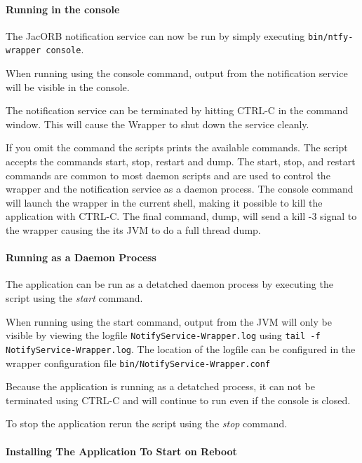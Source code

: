 \paragraph{Running in the console}
\label{sec:running-console}

 The JacORB notification service  can now be run by simply executing
 \texttt{bin/ntfy-wrapper console}.

 When running using the console command, output from the notification
 service will be visible in the console. 

 The notification service can be terminated by hitting CTRL-C in the command
 window. This will cause the Wrapper to shut down the service cleanly.  

 If you omit the command the scripts prints the available commands.
 The script accepts the commands start, stop, restart and dump. The
 start, stop, and restart commands are common to most daemon scripts
 and are used to control the wrapper and the notification service  as
 a daemon process. The console 
 command will launch the wrapper in the current shell, making it
 possible to kill the application with CTRL-C. The final command,
 dump, will send a kill -3 signal to the wrapper causing the its JVM
 to do a full thread dump.  
 
 \paragraph{Running as a Daemon Process}
 \label{sec:running-as-daemon}
 
 The application can be run as a detatched daemon process by executing
 the script using the \emph{start} command. 

 When running using the start  command, output from the JVM will only
 be visible by viewing the logfile \texttt{NotifyService-Wrapper.log}
 using \texttt{tail -f NotifyService-Wrapper.log}. The location of the
 logfile can be configured in the wrapper configuration file
 \texttt{bin/NotifyService-Wrapper.conf} 

 Because the application is running as a detatched process, it can not
 be terminated using CTRL-C and will continue to run even if the
 console is closed. 
 
 To stop the application rerun the script using the \emph{stop} command.

 
 \paragraph{Installing The Application To Start on Reboot}
 \label{sec:inst-appl-start}

